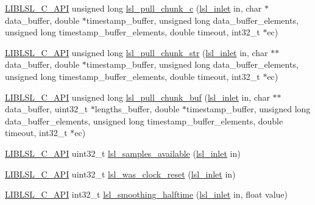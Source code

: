 \begin{DoxyCompactItemize}
\item 
\hyperlink{lsl__cpp_8h_aafd0ef1813e8be84a1420c4f1df64615}{L\+I\+B\+L\+S\+L\+\_\+\+C\+\_\+\+A\+PI} unsigned long \hyperlink{namespacelsl_ad160ae0261a0b604b5ebae8a7cf30f00}{lsl\+\_\+pull\+\_\+chunk\+\_\+c} (\hyperlink{namespacelsl_a884a3363cfcba75d7ce8f00c1c4c54f1}{lsl\+\_\+inlet} in, char $\ast$data\+\_\+buffer, double $\ast$timestamp\+\_\+buffer, unsigned long data\+\_\+buffer\+\_\+elements, unsigned long timestamp\+\_\+buffer\+\_\+elements, double timeout, int32\+\_\+t $\ast$ec)
\item 
\hyperlink{lsl__cpp_8h_aafd0ef1813e8be84a1420c4f1df64615}{L\+I\+B\+L\+S\+L\+\_\+\+C\+\_\+\+A\+PI} unsigned long \hyperlink{namespacelsl_aeac6202687776ae5d0155226869237d0}{lsl\+\_\+pull\+\_\+chunk\+\_\+str} (\hyperlink{namespacelsl_a884a3363cfcba75d7ce8f00c1c4c54f1}{lsl\+\_\+inlet} in, char $\ast$$\ast$data\+\_\+buffer, double $\ast$timestamp\+\_\+buffer, unsigned long data\+\_\+buffer\+\_\+elements, unsigned long timestamp\+\_\+buffer\+\_\+elements, double timeout, int32\+\_\+t $\ast$ec)
\item 
\hyperlink{lsl__cpp_8h_aafd0ef1813e8be84a1420c4f1df64615}{L\+I\+B\+L\+S\+L\+\_\+\+C\+\_\+\+A\+PI} unsigned long \hyperlink{namespacelsl_a90d24057f9ba37f33d3539666af27082}{lsl\+\_\+pull\+\_\+chunk\+\_\+buf} (\hyperlink{namespacelsl_a884a3363cfcba75d7ce8f00c1c4c54f1}{lsl\+\_\+inlet} in, char $\ast$$\ast$data\+\_\+buffer, uint32\+\_\+t $\ast$lengths\+\_\+buffer, double $\ast$timestamp\+\_\+buffer, unsigned long data\+\_\+buffer\+\_\+elements, unsigned long timestamp\+\_\+buffer\+\_\+elements, double timeout, int32\+\_\+t $\ast$ec)
\item 
\hyperlink{lsl__cpp_8h_aafd0ef1813e8be84a1420c4f1df64615}{L\+I\+B\+L\+S\+L\+\_\+\+C\+\_\+\+A\+PI} uint32\+\_\+t \hyperlink{namespacelsl_ab5511189be4bb2c887fd5e0bd0ab9b00}{lsl\+\_\+samples\+\_\+available} (\hyperlink{namespacelsl_a884a3363cfcba75d7ce8f00c1c4c54f1}{lsl\+\_\+inlet} in)
\item 
\hyperlink{lsl__cpp_8h_aafd0ef1813e8be84a1420c4f1df64615}{L\+I\+B\+L\+S\+L\+\_\+\+C\+\_\+\+A\+PI} uint32\+\_\+t \hyperlink{namespacelsl_a3b98f7920895623517758ed1500bcad3}{lsl\+\_\+was\+\_\+clock\+\_\+reset} (\hyperlink{namespacelsl_a884a3363cfcba75d7ce8f00c1c4c54f1}{lsl\+\_\+inlet} in)
\item 
\hyperlink{lsl__cpp_8h_aafd0ef1813e8be84a1420c4f1df64615}{L\+I\+B\+L\+S\+L\+\_\+\+C\+\_\+\+A\+PI} int32\+\_\+t \hyperlink{namespacelsl_a71b6f856d04b6519ab6b249499ad4e91}{lsl\+\_\+smoothing\+\_\+halftime} (\hyperlink{namespacelsl_a884a3363cfcba75d7ce8f00c1c4c54f1}{lsl\+\_\+inlet} in, float value)

\end{DoxyCompactItemize}
